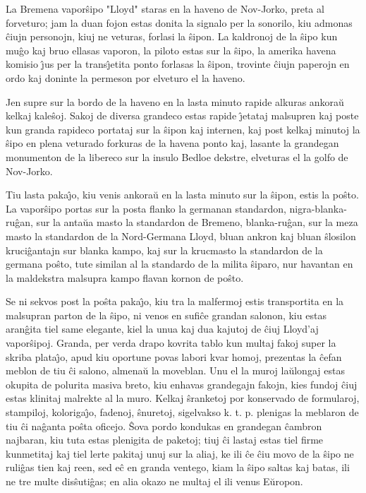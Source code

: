    La Bremena vapor\^sipo "Lloyd" staras en la haveno de Nov-Jorko, preta
al forveturo; jam la duan fojon estas donita la signalo per la
sonorilo, kiu admonas \^ciujn personojn, kiuj ne veturas, forlasi la
\^sipon. La kaldronoj de la \^sipo kun mu\^go kaj bruo ellasas
vaporon, la piloto estas sur la \^sipo, la amerika havena komisio
\^{\j}us per la trans\^{\j}etita ponto forlasas la \^sipon, trovinte
\^ciujn paperojn en ordo kaj doninte la permeson por elveturo el la
haveno.

   Jen supre sur la bordo de la haveno en la lasta minuto rapide
alkuras ankora\u u kelkaj kale\^soj. Sakoj de diversa grandeco estas
rapide \^{\j}etataj malsupren kaj poste kun granda rapideco portataj
sur la \^sipon kaj internen, kaj post kelkaj minutoj la \^sipo en
plena veturado forkuras de la havena ponto kaj, lasante la grandegan
monumenton de la libereco sur la insulo Bedloe dekstre, elveturas el
la golfo de Nov-Jorko.

   Tiu lasta paka\^{\j}o, kiu venis ankora\u u en la lasta minuto sur la
\^sipon, estis la po\^sto. La vapor\^sipo portas sur la posta flanko
la germanan standardon, nigra-blanka-ru\^gan, sur la anta\u ua masto
la standardon de Bremeno, blanka-ru\^gan, sur la meza masto la
standardon de la Nord-Germana Lloyd, bluan ankron kaj bluan
\^slosilon kruci\^gantajn sur blanka kampo, kaj sur la krucmasto la
standardon de la germana po\^sto, tute similan al la standardo de la
milita \^siparo, nur havantan en la maldekstra malsupra kampo flavan
kornon de po\^sto.

   Se ni sekvos post la po\^sta paka\^{\j}o, kiu tra la malfermoj estis
transportita en la malsupran parton de la \^sipo, ni venos en
sufi\^ce grandan salonon, kiu estas aran\^gita tiel same elegante,
kiel la unua kaj dua kajutoj de \^ciuj Lloyd'aj vapor\^sipoj.
Granda, per verda drapo kovrita tablo kun multaj fakoj super la
skriba plata\^{\j}o, apud kiu oportune povas labori kvar homoj,
prezentas la \^cefan meblon de tiu \^ci salono, almena\u u la
moveblan. Unu el la muroj la\u ulongaj estas okupita de polurita
masiva breto, kiu enhavas grandegajn fakojn, kies fundoj \^ciuj
estas klinitaj malrekte al la muro. Kelkaj \^sranketoj por
konservado de formularoj, stampiloj, koloriga\^{\j}o, fadenoj,
\^snuretoj, sigelvakso k. t. p. plenigas la meblaron de tiu \^ci
na\^ganta po\^sta oficejo. \^Sova pordo kondukas en grandegan
\^cambron najbaran, kiu tuta estas plenigita de paketoj; tiuj \^ci
lastaj estas tiel firme kunmetitaj kaj tiel lerte pakitaj unuj sur
la aliaj, ke ili \^ce \^ciu movo de la \^sipo ne ruli\^gas tien kaj
reen, sed e\^c en granda ventego, kiam la \^sipo saltas kaj batas,
ili ne tre multe dis\^suti\^gas; en alia okazo ne multaj el ili
venus E\u uropon.

